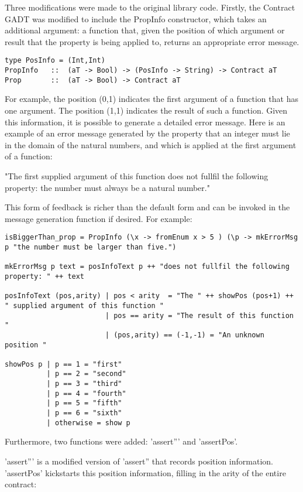 \documentclass[10pt,a4paper]{article}
\begin{document}
Three modifications were made to the original library code.
Firstly, the Contract GADT was modified to include the PropInfo constructor, which takes an additional argument: a function that, given the position of which argument or result that the property is being applied to, returns an appropriate error message.

\begin{lstlisting}
type PosInfo = (Int,Int)
PropInfo   ::  (aT -> Bool) -> (PosInfo -> String) -> Contract aT
Prop       ::  (aT -> Bool) -> Contract aT
\end{lstlisting}

For example, the position (0,1) indicates the first argument of a function that has one argument.
The position (1,1) indicates the result of such a function.
Given this information, it is possible to generate a detailed error message.
Here is an example of an error message generated by the property that an integer must lie in the domain of the natural numbers, and which is applied at the first argument of a function: 

"The first supplied argument of this function does not fullfil the following property: the number must always be a natural number."

This form of feedback is richer than the default form and can be invoked in the message generation function if desired.
For example:

\begin{lstlisting}
isBiggerThan_prop = PropInfo (\x -> fromEnum x > 5 ) (\p -> mkErrorMsg p "the number must be larger than five.")

mkErrorMsg p text = posInfoText p ++ "does not fullfil the following property: " ++ text

posInfoText (pos,arity) | pos < arity  = "The " ++ showPos (pos+1) ++ " supplied argument of this function "
                        | pos == arity = "The result of this function "
                        | (pos,arity) == (-1,-1) = "An unknown position "

showPos p | p == 1 = "first"
          | p == 2 = "second"
          | p == 3 = "third"
          | p == 4 = "fourth"
          | p == 5 = "fifth"
          | p == 6 = "sixth"
          | otherwise = show p
\end{lstlisting}

Furthermore, two functions were added: 'assert''' and 'assertPos'.

'assert''' is a modified version of 'assert'' that records position information.
'assertPos' kickstarts this position information, filling in the arity of the entire contract:
\end{document}
